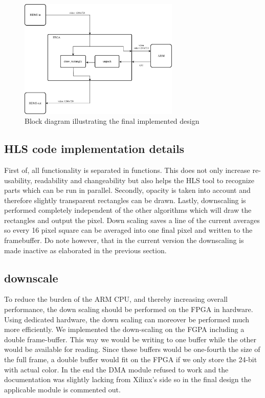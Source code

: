 \documentclass[conference]{IEEEtran}
\begin{document}
\begin{figure}[h!]
    \centering
    \includegraphics[width=0.68\textwidth]{resources/BlockDiagram-Revised.pdf}
    \caption{Block diagram illustrating the final implemented design}
    \label{fig:blockdiagramFPGA-revised}
\end{figure}
\subsection{HLS code implementation details}
First of, all functionality is separated in functions. This does not only increase re-usability, readability and changeability but also helps the HLS tool to recognize parts which can be run in parallel. Secondly, opacity is taken into account and therefore slightly transparent rectangles can be drawn. Lastly, downscaling is performed completely independent of the other algorithms which will draw the rectangles and output the pixel. Down scaling saves a line of the current averages so every 16 pixel square can be averaged into one final pixel and written to the framebuffer. Do note however, that in the current version the downscaling is made inactive as elaborated in the previous section.

\subsection{downscale}
To reduce the burden of the ARM CPU, and thereby increasing overall performance, the down scaling should be performed on the FPGA in hardware. Using dedicated hardware, the down scaling can moreover be performed much more efficiently. We implemented the down-scaling on the FGPA including a double frame-buffer. This way we would be writing to one buffer while the other would be available for reading. Since these buffers would be one-fourth the size of the full frame, a double buffer would fit on the FPGA if we only store the 24-bit with actual color. In the end the DMA module refused to work and the documentation was slightly lacking from Xilinx's side so in the final design the applicable module is commented out.
\end{document}
